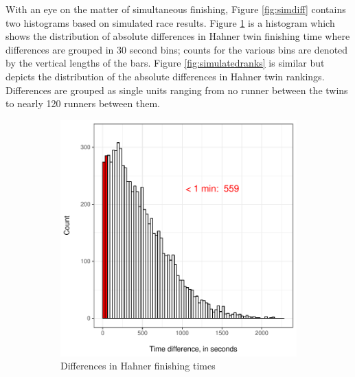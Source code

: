 \documentclass[12pt,titlepage]{article}
\begin{document}
With an eye on the matter of simultaneous finishing, Figure
\ref{fig:simdiff} contains two histograms based on simulated race
results. Figure \ref{fig:simulatedfinishtimes} is a histogram which
shows the distribution of absolute differences in Hahner twin
finishing time where differences are grouped in 30 second bins; counts
for the various bins are denoted by the vertical lengths of the bars.
Figure \ref{fig:simulatedranks} is similar but depicts the
distribution of the absolute differences in Hahner twin rankings.
Differences are grouped as single units ranging from no runner between
the twins to nearly 120 runners between them.

\begin{figure}[!ht]
  \centering
  \caption{Distribution of Hahner twin results in 10,000 simulated
    marathons, based on personal best times}
  \label{fig:simdiff}
  \begin{subfigure}{.45\textwidth}
    \includegraphics[width=\textwidth,
    keepaspectratio]{simulated_time_with_age.pdf}
    \caption{Differences in Hahner finishing times}
    \label{fig:simulatedfinishtimes}
  \end{subfigure}
  \begin{subfigure}{.45\textwidth}

\end{subfigure}
\end{figure}
\end{document}
